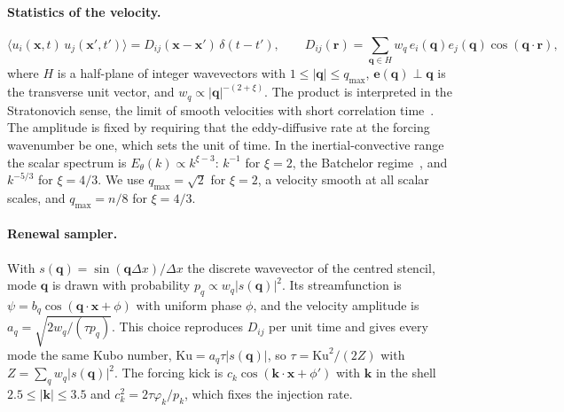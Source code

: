 \documentclass[aps,prfluids,reprint,onecolumn,amsmath,amssymb,nofootinbib,floatfix]{revtex4-2}
\begin{document}
\paragraph{Statistics of the velocity.}
\begin{equation}
\langle u_i(\mathbf{x},t)\,u_j(\mathbf{x}',t')\rangle = D_{ij}(\mathbf{x}-\mathbf{x}')\,\delta(t-t'),
\qquad
D_{ij}(\mathbf{r}) = \sum_{\mathbf{q}\in H} w_q\, e_i(\mathbf{q})e_j(\mathbf{q})\cos(\mathbf{q}\!\cdot\!\mathbf{r}),
\end{equation}
where $H$ is a half-plane of integer wavevectors with $1\le|\mathbf{q}|\le q_{\max}$,
$\mathbf{e}(\mathbf{q})\perp\mathbf{q}$ is the transverse unit vector, and
$w_q\propto|\mathbf{q}|^{-(2+\xi)}$. The product is interpreted in the
Stratonovich sense, the limit of smooth velocities with short correlation
time~\cite{WongZakai1965}. The amplitude is fixed by requiring that the
eddy-diffusive rate at the forcing wavenumber be one, which sets the unit of time.
In the inertial-convective range the scalar spectrum is
$E_\theta(k)\propto k^{\xi-3}$: $k^{-1}$ for $\xi=2$, the Batchelor
regime~\cite{Batchelor1959}, and $k^{-5/3}$ for $\xi=4/3$. We use
$q_{\max}=\sqrt2$ for $\xi=2$, a velocity smooth at all scalar scales, and
$q_{\max}=n/8$ for $\xi=4/3$.

\paragraph{Renewal sampler.} With $s(\mathbf{q})=\sin(\mathbf{q}\Delta x)/\Delta x$
the discrete wavevector of the centred stencil, mode $\mathbf{q}$ is drawn with
probability $p_q\propto w_q|s(\mathbf{q})|^2$. Its streamfunction is
$\psi=b_q\cos(\mathbf{q}\!\cdot\!\mathbf{x}+\phi)$ with uniform phase $\phi$, and the
velocity amplitude is $a_q=\sqrt{2w_q/(\tau p_q)}$. This choice reproduces
$D_{ij}$ per unit time and gives every mode the same Kubo number,
$\mathrm{Ku}=a_q\tau|s(\mathbf{q})|$, so $\tau=\mathrm{Ku}^2/(2Z)$ with
$Z=\sum_q w_q|s(\mathbf{q})|^2$. The forcing kick is
$c_k\cos(\mathbf{k}\!\cdot\!\mathbf{x}+\phi')$ with $\mathbf{k}$ in the shell
$2.5\le|\mathbf{k}|\le3.5$ and $c_k^2=2\tau\varphi_k/p_k$, which fixes the
injection rate.
\end{document}
